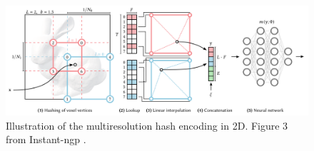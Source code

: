 \begin{figure}[h]
    \centering
    \includegraphics[width=1.0\textwidth]{figures/instant-ngp-hash-encoding.png}
    \caption[Illustration of multiresolution hash encoding]{Illustration of the multiresolution hash encoding in 2D. Figure 3 from Instant-ngp \cite{muller_instant_2022}.}
    \label{fig:instant-ngp-hash-encoding}
\end{figure}